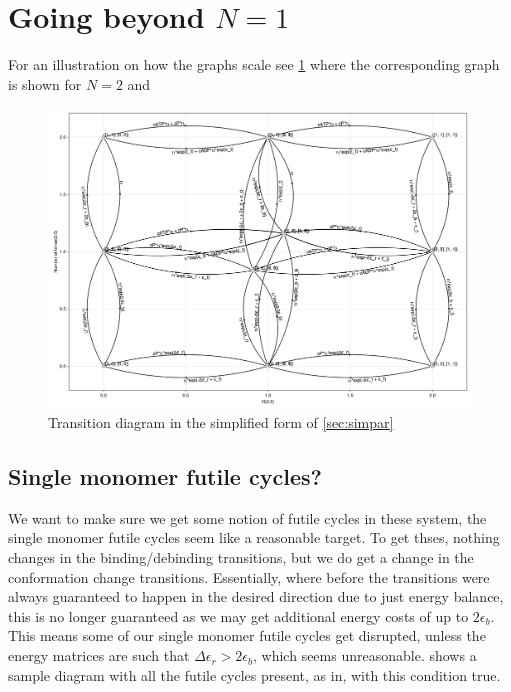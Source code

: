 \documentclass[11pt]{article}
\begin{document}
\newpage
\section{Going beyond $N=1$}
For an illustration on how the graphs scale see \cref{fig:N2trans} where the corresponding graph is shown for $N=2$ and 

\begin{figure}[H]
    \includegraphics[width=\textwidth]{../../plots/simple_sg_B=1_C=2_N=2_version=2.5.png}
    \caption{
        Transition diagram in the simplified form of \cref{sec:simpar}
    }\label{fig:N2trans}
\end{figure}

\subsection{Single monomer futile cycles?}
We want to make sure we get some notion of futile cycles in these system, the single monomer futile cycles seem like a reasonable target.
To get thses, nothing changes in the binding/debinding transitions, but we do get a change in the conformation change transitions.
Essentially, where before the transitions were always guaranteed to happen in the desired direction due to just energy balance, this is no longer guaranteed as we may get additional energy costs of up to $2\epsilon_b$.
This means some of our single monomer futile cycles get disrupted, unless the energy matrices are such that $\Delta\epsilon_r > 2\epsilon_b$, which seems unreasonable.
 shows a sample diagram with all the futile cycles present, as in, with this condition true.
\end{document}

